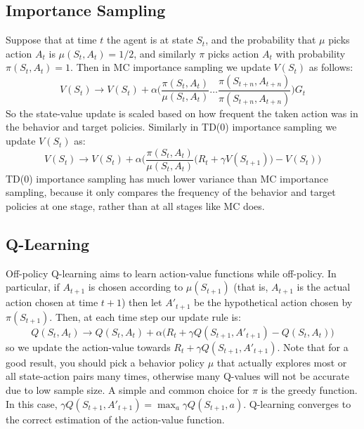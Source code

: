 \documentclass{article}
\begin{document}
\subsection{Importance Sampling}
Suppose that at time $t$ the agent is at state $S_t$, and the probability that $\mu$ picks action $A_t$ is $\mu(S_t, A_t) = 1/2$, and similarly $\pi$ picks action $A_t$ with probability $\pi(S_t, A_t) = 1$. Then in MC importance sampling we update $V(S_t)$ as follows:
\begin{equation}\label{eq:mc_importance_sampling}
V(S_t) \rightarrow V(S_t) + \alpha\bigg(\frac{\pi(S_t, A_t)}{\mu(S_t, A_t)}\ldots\frac{\pi(S_{t+n}, A_{t+n})}{\pi(S_{t+n}, A_{t+n})}\bigg)G_t
\end{equation}
So the state-value update is scaled based on how frequent the taken action was in the behavior and target policies. Similarly in TD(0) importance sampling we update $V(S_t)$ as:
\begin{equation}\label{eq:td0_importance_sampling}
V(S_t) \rightarrow V(S_t) + \alpha\bigg(\frac{\pi(S_t, A_t)}{\mu(S_t, A_t)} \big(R_t + \gamma V(S_{t+1})\big)- V(S_t)\bigg)
\end{equation}
TD(0) importance sampling has much lower variance than MC importance sampling, because it only compares the frequency of the behavior and target policies at one stage, rather than at all stages like MC does.

\subsection{Q-Learning}

Off-policy Q-learning aims to learn action-value functions while off-policy. In particular, if $A_{t+1}$ is chosen according to $\mu(S_{t+1})$ (that is, $A_{t+1}$ is the actual action chosen at time $t+1$) then let $A'_{t+1}$ be the hypothetical action chosen by $\pi(S_{t+1})$. Then, at each time step our update rule is:
\begin{equation}\label{eq:q_learning_update}
Q(S_t, A_t) \rightarrow Q(S_t, A_t) + \alpha\bigg(R_t + \gamma Q(S_{t+1}, A'_{t+1}) - Q(S_t, A_t)\bigg)
\end{equation}
so we update the action-value towards $R_t + \gamma Q(S_{t+1}, A'_{t+1})$. Note that for a good result, you should pick a behavior policy $\mu$ that actually explores most or all state-action pairs many times, otherwise many Q-values will not be accurate due to low sample size. A simple and common choice for $\pi$ is the greedy function. In this case, $\gamma Q(S_{t+1}, A'_{t+1}) = \max_{a} \gamma Q(S_{t+1}, a)$. Q-learning converges to the correct estimation of the action-value function.
\end{document}
